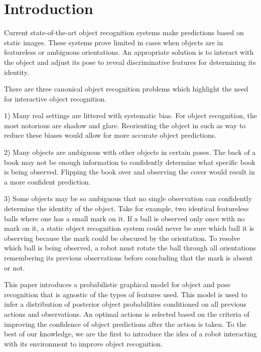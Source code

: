 \section{Introduction}
    \label{sec:intro}


    Current state-of-the-art object recognition systems make predictions based on static images. These systems prove limited in cases when objects are in featureless or ambiguous orientations. An appropriate solution is to interact with the object and adjust its pose to reveal discriminative features for determining its identity.

    There are three canonical object recognition problems which highlight the need for interactive object recognition.

    1) Many real settings are littered with systematic bias. For object recognition, the most notorious are shadow and glare. Reorienting the object in such as way to reduce these biases would allow for more accurate object predictions.

    2) Many objects are ambiguous with other objects in certain poses. The back of a book may not be enough information to confidently determine what specific book is being observed. Flipping the book over and observing the cover would result in a more confident prediction. 

    3) Some objects may be so ambiguous that no single observation can confidently determine the identity of the object. Take for example, two identical featureless balls where one has a small mark on it. If a ball is observed only once with no mark on it, a static object recognition system could never be sure which ball it is observing because the mark could be obscured by the orientation. To resolve which ball is being observed, a robot must rotate the ball through all orientations remembering its previous observations before concluding that the mark is absent or not.

    This paper introduces a probabilistic graphical model for object and pose recognition that is agnostic of the types of  features used. This model is used to infer a distribution of posterior object probabilities conditioned on all previous actions and observations. An optimal actions is selected based on the criteria of improving the confidence of object predictions after the action is taken. To the best of our knowledge, we are the first to introduce the idea of a robot interacting with its environment to improve object recognition. 


